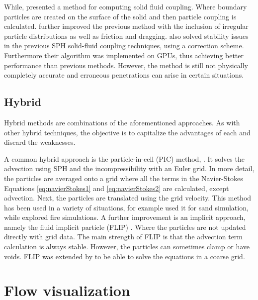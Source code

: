 While, \cite{Muller2004} presented a method for computing solid fluid coupling. Where boundary particles are created on the surface of the solid and then particle coupling is calculated.
\cite{Akinci2012} further improved the previous method with the inclusion of irregular particle distributions as well as friction and dragging. 
\cite{Shao2014} also solved stability issues in the previous SPH solid-fluid coupling techniques, using a correction scheme.
Furthermore their algorithm was implemented on GPUs, thus achieving better performance than previous methods.  
However, the method is still not physically completely accurate and erroneous penetrations can arise in certain situations. 

\subsection{Hybrid}

Hybrid methods are combinations of the aforementioned approaches.
As with other hybrid techniques, the objective is to capitalize the advantages of each and discard the weaknesses.

A common hybrid approach is the particle-in-cell (PIC) method, \cite{Harlow1962}.
It solves the advection using SPH and the incompressibility with an Euler grid.
In more detail, the particles are averaged onto a grid where all the terms in the Navier-Stokes Equations \ref{eq:navierStokes1} and \ref{eq:navierStokes2} are calculated, except advection.
Next, the particles are translated using the grid velocity.
This method has been used in a variety of situations, for example \cite{Zhu2005} used it for sand simulation, while \cite{Horvath2009} explored fire simulations.
A further improvement is an implicit approach, namely the fluid implicit particle (FLIP) \cite{J.U.Brackbill1986}.
Where the particles are not updated directly with grid data.
The main strength of FLIP is that the advection term calculation is always stable.
However, the particles can sometimes clamp or have voids.
FLIP was extended by \cite{Raveendran2011} to be able to solve the equations in a coarse grid. 

\section{Flow visualization}
\label{sec:flowVisualization}


